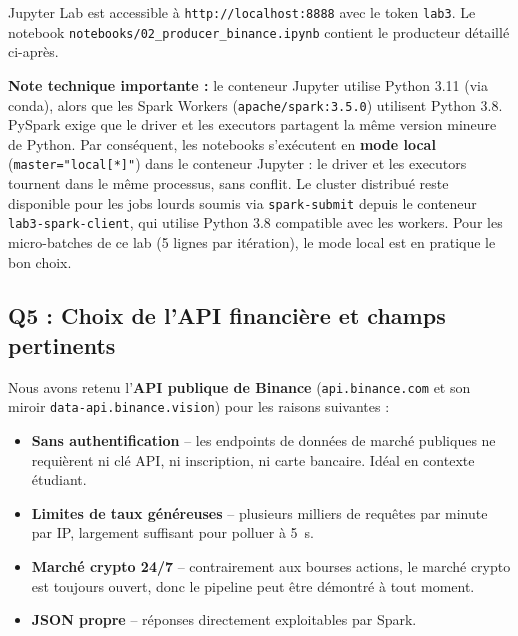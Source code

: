 \documentclass{RapportINPTCLOUD}
\begin{document}
Jupyter Lab est accessible \`{a} \texttt{http://localhost:8888} avec le token \texttt{lab3}. Le notebook \texttt{notebooks/02\_producer\_binance.ipynb} contient le producteur d\'{e}taill\'{e} ci-apr\`{e}s.

\textbf{Note technique importante :} le conteneur Jupyter utilise Python 3.11 (via conda), alors que les Spark Workers (\texttt{apache/spark:3.5.0}) utilisent Python 3.8. PySpark exige que le driver et les executors partagent la m\^{e}me version mineure de Python. Par cons\'{e}quent, les notebooks s'ex\'{e}cutent en \textbf{mode local} (\texttt{master="local[*]"}) dans le conteneur Jupyter : le driver et les executors tournent dans le m\^{e}me processus, sans conflit. Le cluster distribu\'{e} reste disponible pour les jobs lourds soumis via \texttt{spark-submit} depuis le conteneur \texttt{lab3-spark-client}, qui utilise Python 3.8 compatible avec les workers. Pour les micro-batches de ce lab (5 lignes par it\'{e}ration), le mode local est en pratique le bon choix.

\subsection{Q5 : Choix de l'API financi\`{e}re et champs pertinents}

Nous avons retenu l'\textbf{API publique de Binance} (\texttt{api.binance.com} et son miroir \texttt{data-api.binance.vision}) pour les raisons suivantes :
\begin{itemize}[leftmargin=2em]
    \item \textbf{Sans authentification} -- les endpoints de donn\'{e}es de march\'{e} publiques ne requi\`{e}rent ni cl\'{e} API, ni inscription, ni carte bancaire. Id\'{e}al en contexte \'{e}tudiant.
    \item \textbf{Limites de taux g\'{e}n\'{e}reuses} -- plusieurs milliers de requ\^{e}tes par minute par IP, largement suffisant pour polluer \`{a} 5~s.
    \item \textbf{March\'{e} crypto 24/7} -- contrairement aux bourses actions, le march\'{e} crypto est toujours ouvert, donc le pipeline peut \^{e}tre d\'{e}montr\'{e} \`{a} tout moment.
    \item \textbf{JSON propre} -- r\'{e}ponses directement exploitables par Spark.
\end{itemize}
\end{document}
